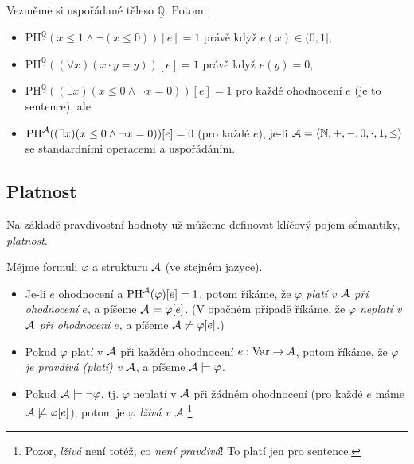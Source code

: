 \begin{example}
Vezměme si uspořádané těleso $\underline{\mathbb Q}$. Potom:
\begin{itemize}
    \item $\mathrm{PH}^{\underline{\mathbb Q}}(x\leq 1 \land \neg (x\leq 0))[e]=1$ právě když $e(x)\in (0,1]$,
    \item $\mathrm{PH}^{\underline{\mathbb Q}}((\forall x)(x\cdot y = y))[e]=1$ právě když $e(y)=0$,
    \item $\mathrm{PH}^{\underline{\mathbb Q}}((\exists x)(x \leq 0 \land \neg x=0))[e]=1$ pro každé ohodnocení $e$ (je to sentence), ale 
    \item $\mathrm{PH}^{\mathcal{A}}((\exists x)(x \leq 0 \land \neg x=0))[e]=0$ (pro každé $e$), je-li $\mathcal{A}=\langle \mathbb N,+,-,0,\cdot,1,\leq\rangle$ se standardními operacemi a uspořádáním.
\end{itemize}    
\end{example}


\subsection{Platnost}

Na základě pravdivostní hodnoty už můžeme definovat klíčový pojem sémantiky, \emph{platnost}.

\begin{definition}
Mějme formuli $\varphi$ a strukturu $\mathcal{A}$ (ve stejném jazyce). 
\begin{itemize}
    \item Je-li $e$ ohodnocení a $\mathrm{PH}^{\mathcal{A}}(\varphi)[e]=1$, potom říkáme, že \emph{$\varphi$ platí v $\mathcal{A}$ při ohodnocení $e$}, a píšeme $\mathcal{A}\models\varphi[e]$. (V opačném případě říkáme, že \emph{$\varphi$ neplatí v $\mathcal{A}$ při ohodnocení $e$}, a píšeme $\mathcal{A}\not\models\varphi[e]$.)
    \item Pokud $\varphi$ platí v $\mathcal{A}$ při každém ohodnocení $e:\operatorname{Var}\to A$, potom říkáme, že \emph{$\varphi$ je pravdivá (platí) v $\mathcal{A}$}, a píšeme $\mathcal{A}\models\varphi$.
    \item Pokud $\mathcal{A}\models\neg\varphi$, tj. $\varphi$ neplatí v $\mathcal{A}$ při žádném ohodnocení (pro každé $e$ máme $\mathcal{A}\not\models\varphi[e]$), potom je \emph{$\varphi$ lživá v $\mathcal{A}$}.\footnote{Pozor, \emph{lživá} není totéž, co \emph{není pravdivá}! To platí jen pro sentence.}
\end{itemize}    
\end{definition}

